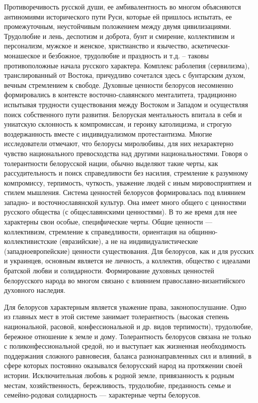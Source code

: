 Противоречивость русской души, ее амбивалентность во многом объясняются антиномиями исторического пути Руси, которые ей пришлось испытать, ее промежуточным, неустойчивым положением между двумя цивилизациями. Трудолюбие и лень, деспотизм и доброта, бунт и смирение, коллективизм и персонализм, мужское и женское, христианство и язычество, аскетически-монашеское и безбожное, трудолюбие и праздность и т.д. – таковы противоположные начала русского характера. Комплекс раболепия (сервилизма), транслированный от Востока, причудливо сочетался здесь с бунтарским духом, вечным стремлением к свободе.
Духовные ценности белорусов несомненно формировались в контексте восточно-славянского менталитета, традиционно испытывая трудности существования между Востоком и Западом и осуществляя поиск собственного пути развития. Белоруская ментальность впитала в себя и униатскую склонность к компромиссам, и героику католицизма, и строгую воздержанность вместе с индивидуализмом протестантизма. Многие исследователи отмечают, что белорусы миролюбивы, для них нехарактерно чувство национального превосходства над другими национальностями. Говоря о толерантности белорусской нации, обычно выделяют такие черты, как рассудительность и поиск справедливости без насилия, стремление к разумному компромиссу, терпимость, чуткость, уважение людей с иным мировосприятием и стилем мышления.
Система ценностей белорусов формировалась под влиянием западно- и восточнославянской культур. Она имеет много общего с ценностями русского общества (с общеславянскими ценностями). В то же время для нее характерны свои особые, специфические черты. Общие ценности — коллективизм, стремление к справедливости, ориентация на общинно-коллективистские (евразийские), а не на индивидуалистические (западноевропейские) ценности существования. Для белорусов, как и для русских и украинцев, основным является не личность, а коллектив, общество с идеалами братской любви и солидарности. Формирование духовных ценностей белорусского народа во многом связано с влиянием православно-византийского духовного наследия.

Для белорусов характерным является уважение права, законопослушание. Одно из главных мест в этой системе занимает толерантность (высокая степень национальной, расовой, конфессиональной и др. видов терпимости), трудолюбие, бережное отношение к земле и дому. Толерантность белорусов связана не только с поликонфессиональной средой, но и выступает как жизненная необходимость поддержания сложного равновесия, баланса разнонаправленных сил и влияний, в сфере которых постоянно оказывался белорусский народ на протяжении своей истории. Исключительная любовь к родной земле, привязанность к родным местам, хозяйственность, бережливость, трудолюбие, преданность семье и семейно-родовая солидарность — характерные черты белорусов.

